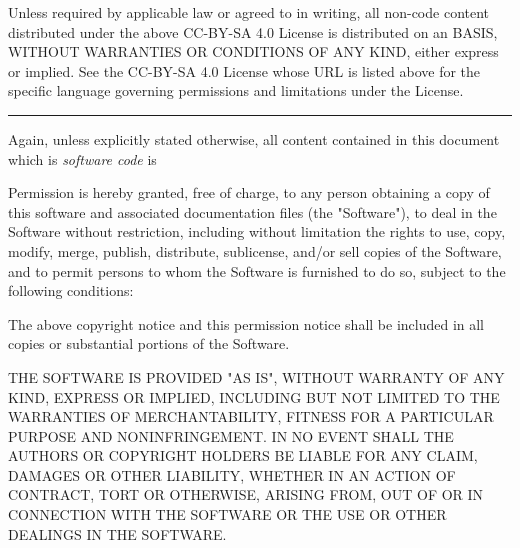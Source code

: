 \blank[small]

Unless required by applicable law or agreed to in writing, all non-code
content distributed under the above CC-BY-SA 4.0 License is distributed
on an  BASIS, WITHOUT WARRANTIES OR CONDITIONS OF ANY KIND,
either express or implied. See the CC-BY-SA 4.0 License whose URL is
listed above for the specific language governing permissions and
limitations under the License.

\blank[medium]
\hrule
\blank[medium]

Again, unless explicitly stated otherwise, all content contained in this
document which is \emph{software code} is

\blank[small]

\startcenteraligned
{}
\stopcenteraligned

\blank[small]

Permission is hereby granted, free of charge, to any person
obtaining a copy of this software and associated documentation
files (the "Software"), to deal in the Software without
restriction, including without limitation the rights to use,
copy, modify, merge, publish, distribute, sublicense, and/or sell
copies of the Software, and to permit persons to whom the
Software is furnished to do so, subject to the following
conditions:

\blank[small]

\startblockquote
\noindent The above copyright notice and this permission notice shall
be included in all copies or substantial portions of the Software.
\stopblockquote

\blank[small]

THE SOFTWARE IS PROVIDED "AS IS", WITHOUT WARRANTY OF ANY KIND,
EXPRESS OR IMPLIED, INCLUDING BUT NOT LIMITED TO THE WARRANTIES
OF MERCHANTABILITY, FITNESS FOR A PARTICULAR PURPOSE AND
NONINFRINGEMENT. IN NO EVENT SHALL THE AUTHORS OR COPYRIGHT
HOLDERS BE LIABLE FOR ANY CLAIM, DAMAGES OR OTHER LIABILITY,
WHETHER IN AN ACTION OF CONTRACT, TORT OR OTHERWISE, ARISING
FROM, OUT OF OR IN CONNECTION WITH THE SOFTWARE OR THE USE OR
OTHER DEALINGS IN THE SOFTWARE.

\stopmakeup
